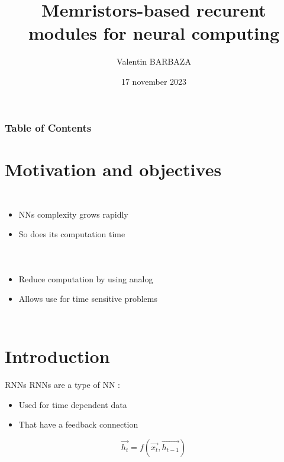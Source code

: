 \documentclass[14pt]{beamer}
\title{Memristors-based recurent modules for neural computing}
\subtitle{}
\author[V. BARBAZA]{{Valentin BARBAZA}}
\date{17 november 2023}
\begin{document}
  \frame{\titlepage}

  \begin{frame}
    \frametitle{Table of Contents}
    \tableofcontents
  \end{frame}

  \section{Motivation and objectives}

  \begin{frame}{\insertsection}
    \begin{columns}
      \begin{itemize}
        \item NNs complexity grows rapidly
        \item So does its computation time
      \end{itemize}
      
    \end{columns}
  \end{frame}

  \begin{frame}{\insertsection}
    \begin{columns}
      \begin{itemize}
        \item Reduce computation by using analog
        \item Allows use for time sensitive problems
      \end{itemize}
      
    \end{columns}
  \end{frame}

  \section{Introduction}

  \begin{frame}{\insertsection}{RNNs}
    RNNs are a type of NN :
    \begin{itemize}
      \item Used for time dependent data
      \item That have a feedback connection
    \end{itemize}

    \begin{equation}\label{eq:rnn}
      \overrightarrow{h_t}=f(\overrightarrow{x_t},\overrightarrow{h_{t-1}})
    \end{equation}
  \end{frame}
\end{document}
